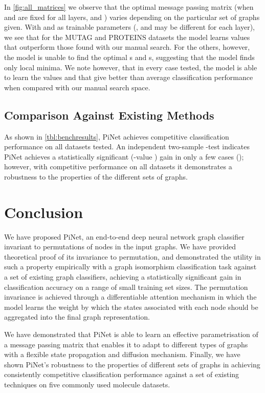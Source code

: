 \documentclass{article}
\theoremstyle{definition}
\begin{document}
In \autoref{fig:all_matrices} we observe that the optimal message passing matrix (when  and  are fixed for all layers, and ) varies depending on the particular set of graphs given. With  and  as trainable parameters (, and  may be different for each layer), we see that for the MUTAG and PROTEINS datasets the model learns values that outperform those found with our manual search. For the others, however, the model is unable to find the optimal s and s, suggesting that the model finds only local minima. We note however, that in every case tested, the model is able to learn the values  and  that give better than average classification performance when compared with our manual search space.

\subsection{Comparison Against Existing Methods}

As shown in \autoref{tbl:benchresults}, PiNet achieves competitive classification performance on all datasets tested. An independent two-sample -test indicates PiNet achieves a statistically significant (-value ) gain in only a few cases (); however, with competitive performance on all datasets it demonstrates a robustness to the properties of the different sets of graphs.

\section{Conclusion}

We have proposed PiNet, an end-to-end deep neural network graph classifier invariant to permutations of nodes in the input graphs. We have provided theoretical proof of its invariance to permutation, and demonstrated the utility in such a property empirically with a graph isomorphism classification task against a set of existing graph classifiers, achieving a statistically significant gain in classification accuracy on a range of small training set sizes. The permutation invariance is achieved through a differentiable attention mechanism in which the model learns the weight by which the states associated with each node should be aggregated into the final graph representation.

We have demonstrated that PiNet is able to learn an effective parametrisation of a message passing matrix that enables it to adapt to different types of graphs with a flexible state propagation and diffusion mechanism. Finally, we have shown PiNet's robustness to the properties of different sets of graphs in achieving consistently competitive classification performance against a set of existing techniques on five commonly used molecule datasets.
\end{document}
